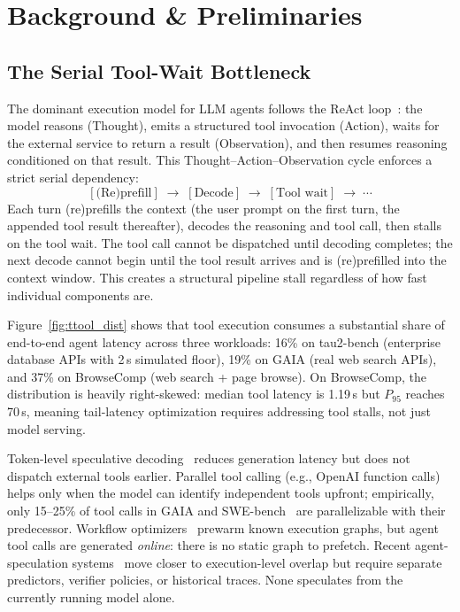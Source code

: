 \section{Background \& Preliminaries}
\label{sec:background}

\subsection{The Serial Tool-Wait Bottleneck}
\label{sec:bottleneck}

The dominant execution model for LLM agents follows the ReAct
loop~\citep{yao_react_2023}: the model reasons (Thought), emits a structured tool
invocation (Action), waits for the external service to return a result (Observation),
and then resumes reasoning conditioned on that result.
This Thought--Action--Observation cycle enforces a strict serial dependency:
\[
[\text{(Re)prefill}] \;\to\; [\text{Decode}] \;\to\; [\text{Tool wait}] \;\to\; \cdots
\]
Each turn (re)prefills the context (the user prompt on the first turn, the appended tool
result thereafter), decodes the reasoning and tool call, then stalls on the tool wait.
The tool call cannot be dispatched until decoding completes; the next decode cannot begin
until the tool result arrives and is (re)prefilled into the context window.
This creates a structural pipeline stall regardless of how fast individual components are.

Figure~\ref{fig:ttool_dist} shows that tool execution consumes a substantial share of
end-to-end agent latency across three workloads: 16\% on tau2-bench (enterprise database
APIs with 2\,s simulated floor), 19\% on GAIA (real web search APIs), and 37\% on
BrowseComp (web search + page browse).
On BrowseComp, the distribution is heavily right-skewed: median tool latency is 1.19\,s
but $P_{95}$ reaches 70\,s, meaning tail-latency optimization requires addressing tool
stalls, not just model serving.

Token-level speculative decoding~\citep{leviathan_fast_2023,li_eagle_2024,cai_medusa_2024}
reduces generation latency but does not dispatch external tools earlier.
Parallel tool calling (e.g., OpenAI function calls) helps only when the model can identify
independent tools upfront; empirically, only 15--25\% of tool calls in GAIA and SWE-bench~\citep{jimenez_swebench_2024}
are parallelizable with their predecessor.
Workflow optimizers~\citep{orion,stojkovic2023specfaas,fu2024serverlessllm} prewarm known
execution graphs, but agent tool calls are generated \emph{online}: there is no static
graph to prefetch.
Recent agent-speculation systems~\citep{ye_speculative_2026,zhong_dualspec_2026,sui_act_2026}
move closer to execution-level overlap but require separate predictors, verifier policies,
or historical traces.
None speculates from the currently running model alone.

